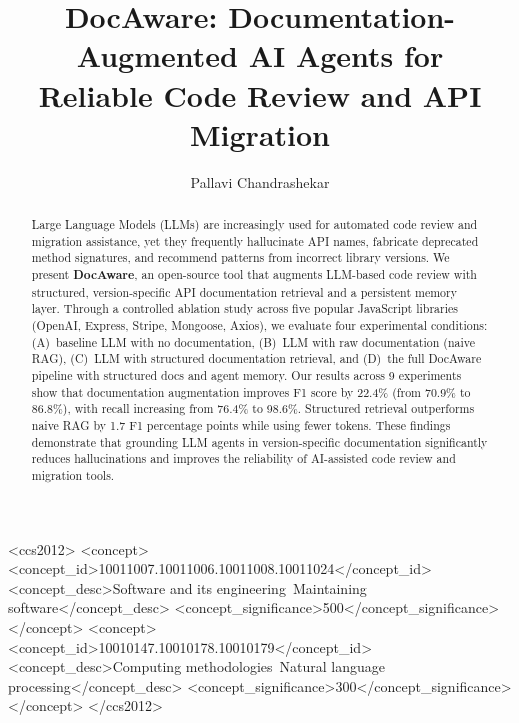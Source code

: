 \documentclass[sigconf,nonacm]{acmart}
\begin{document}
\title{DocAware: Documentation-Augmented AI Agents for\\Reliable Code Review and API Migration}

\author{Pallavi Chandrashekar}

\begin{abstract}
Large Language Models (LLMs) are increasingly used for automated code review and migration assistance, yet they frequently hallucinate API names, fabricate deprecated method signatures, and recommend patterns from incorrect library versions. We present \textbf{DocAware}, an open-source tool that augments LLM-based code review with structured, version-specific API documentation retrieval and a persistent memory layer. Through a controlled ablation study across five popular JavaScript libraries (OpenAI, Express, Stripe, Mongoose, Axios), we evaluate four experimental conditions: (A)~baseline LLM with no documentation, (B)~LLM with raw documentation (naive RAG), (C)~LLM with structured documentation retrieval, and (D)~the full DocAware pipeline with structured docs and agent memory. Our results across 9 experiments show that documentation augmentation improves F1 score by 22.4\% (from 70.9\% to 86.8\%), with recall increasing from 76.4\% to 98.6\%. Structured retrieval outperforms naive RAG by 1.7 F1 percentage points while using fewer tokens. These findings demonstrate that grounding LLM agents in version-specific documentation significantly reduces hallucinations and improves the reliability of AI-assisted code review and migration tools.
\end{abstract}

\begin{CCSXML}
<ccs2012>
   <concept>
       <concept_id>10011007.10011006.10011008.10011024</concept_id>
       <concept_desc>Software and its engineering~Maintaining software</concept_desc>
       <concept_significance>500</concept_significance>
   </concept>
   <concept>
       <concept_id>10010147.10010178.10010179</concept_id>
       <concept_desc>Computing methodologies~Natural language processing</concept_desc>
       <concept_significance>300</concept_significance>
   </concept>
</ccs2012>
\end{CCSXML}

\end{document}
